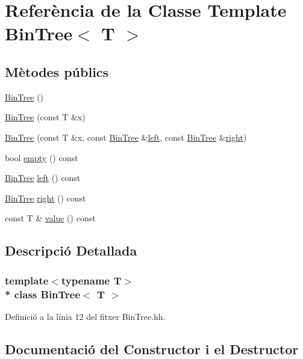 \hypertarget{class_bin_tree}{}\section{Referència de la Classe Template Bin\+Tree$<$ T $>$}
\label{class_bin_tree}
\subsection*{Mètodes públics}
\begin{DoxyCompactItemize}
\item 
\hyperlink{class_bin_tree_a47eef22d29cd023449d97c073c08e5b6}{Bin\+Tree} ()
\item 
\hyperlink{class_bin_tree_a1ab686e0bcf990093ff91fe71744c1a4}{Bin\+Tree} (const T \&x)
\item 
\hyperlink{class_bin_tree_adb7eeff76d08130c943b36af215eb521}{Bin\+Tree} (const T \&x, const \hyperlink{class_bin_tree}{Bin\+Tree} \&\hyperlink{class_bin_tree_a781025fb1c3693e91e851d55b181bedd}{left}, const \hyperlink{class_bin_tree}{Bin\+Tree} \&\hyperlink{class_bin_tree_a009c4bb95a25a1b639da637de32101ce}{right})
\item 
bool \hyperlink{class_bin_tree_a9ca8d7ae95b9bed51eb43f30c8d2bd58}{empty} () const 
\item 
\hyperlink{class_bin_tree}{Bin\+Tree} \hyperlink{class_bin_tree_a781025fb1c3693e91e851d55b181bedd}{left} () const 
\item 
\hyperlink{class_bin_tree}{Bin\+Tree} \hyperlink{class_bin_tree_a009c4bb95a25a1b639da637de32101ce}{right} () const 
\item 
const T \& \hyperlink{class_bin_tree_af545517333e94fdbfccfbc7df7d961fe}{value} () const 
\end{DoxyCompactItemize}


\subsection{Descripció Detallada}
\subsubsection*{template$<$typename T$>$\\*
class Bin\+Tree$<$ T $>$}



Definició a la línia 12 del fitxer Bin\+Tree.\+hh.



\subsection{Documentació del Constructor i el Destructor}
